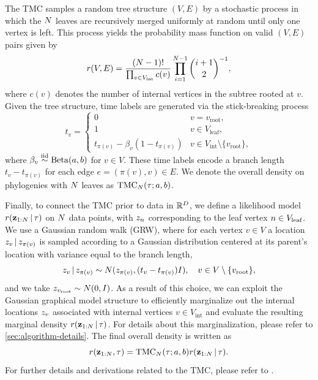 The TMC samples a random tree structure $(V, E)$ by a stochastic process in which the $N$ leaves are recursively merged uniformly at random until only one vertex is left.
This process yields the probability mass function on valid $(V, E)$ pairs given by
\begin{equation}
    r(V, E) = \frac{(N - 1)!}{\prod_{v \in V_\text{int}} c(v)} \prod_{i = 1}^{N-1} {i+1 \choose 2}^{-1},
\end{equation}
where $c(v)$ denotes the number of internal vertices in the subtree rooted at $v$.
Given the tree structure, time labels are generated via the stick-breaking process
\begin{equation}
    t_v = \begin{cases} 0 & v = v_\text{root}, \\ 1 & v \in V_\text{leaf}, \\ t_{\pi(v)} - \beta_v (1 - t_{\pi(v)}) & v \in V_\text{int} \setminus \{v_\text{root}\}, \end{cases}
\end{equation}
where $\beta_v \stackrel{\mathrm{iid}}{\sim} \mathrm{Beta}(a, b)$ for $v \in V$. These time labels encode a branch length $t_v - t_{\pi(v)}$ for each edge $e = (\pi(v), v) \in E$. We denote the overall density on phylogenies with $N$ leaves as $\mathrm{TMC}_N(\tau; a, b)$.

Finally, to connect the TMC prior to data in $\mathbb{R}^D$, we define a likelihood model $r(\mathbf{z}_{1:N} \,|\, \tau)$ on $N$ data points, with $z_n$ corresponding to the leaf vertex $n \in V_\text{leaf}$.
We use a Gaussian random walk (GRW), where for each vertex $v \in V$ a location $z_v \,|\, z_{\pi(v)}$ is sampled according to a Gaussian distribution centered at its parent's location with variance equal to the branch length,
\begin{equation}
    z_v \,|\, z_{\pi(v)} \sim N(z_{\pi(v)}, (t_v - t_{\pi(v)})I), \quad v \in V \setminus \{v_\text{root}\},
    \notag
\end{equation}
and we take $z_{v_\text{root}} \sim N(0, I)$.
As a result of this choice, we can exploit the Gaussian graphical model structure to efficiently marginalize out the internal locations $z_v$ associated with internal vertices $v \in V_\text{int}$ and evaluate the resulting marginal density $r(\mathbf{z}_{1:N} \,|\, \tau)$. For details
about this marginalization, please refer to \autoref{sec:algorithm-details}.
The final overall density is written as
\begin{equation}
    r(\mathbf{z}_{1:N}, \tau) = \mathrm{TMC}_N(\tau; a, b)r(\mathbf{z}_{1:N} \,|\, \tau).
\end{equation}
For further details and derivations related to the TMC,
please refer to \citet{Boyles2012}.

